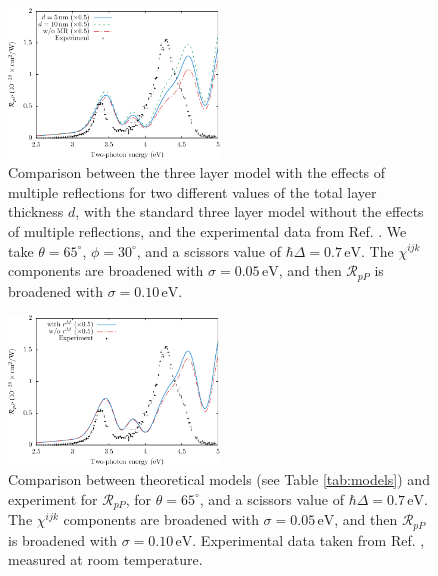 \begin{figure}[H]
\centering
\includegraphics[width=0.5\textwidth]{content/figures/fig-Si1x1-MRthickness}
\caption{Comparison between the three layer model with the effects of multiple reflections for two different values of the total layer thickness $d$, with the standard three layer model without the effects of multiple reflections, and the experimental data from Ref. \cite{mejiaPRB02}. We take $\theta=65^{\circ}$, $\phi=30^{\circ}$, and a scissors value of $\hbar\Delta = 0.7\,\text{eV}$. The $\chi^{ijk}$ components are broadened with $\sigma=0.05\,\text{eV}$, and then $\mathcal{R}_{pP}$ is broadened with $\sigma=0.10\,\text{eV}$.}
\label{fig:average}
\end{figure}

\begin{figure}[H]
\centering
\includegraphics[width=0.5\textwidth]{content/figures/fig-Si1x1-MRno1w}
\caption{Comparison between theoretical models (see Table \ref{tab:models}) and experiment for $\mathcal{R}_{pP}$, for $\theta=65^{\circ}$, and a scissors value of $\hbar\Delta = 0.7\,\text{eV}$. The $\chi^{ijk}$ components are broadened with $\sigma=0.05\,\text{eV}$, and then $\mathcal{R}_{pP}$ is broadened with $\sigma=0.10\,\text{eV}$. Experimental data taken from Ref. \cite{mitchellSS01}, measured at room temperature.}
\label{fig:mr2}
\end{figure}


